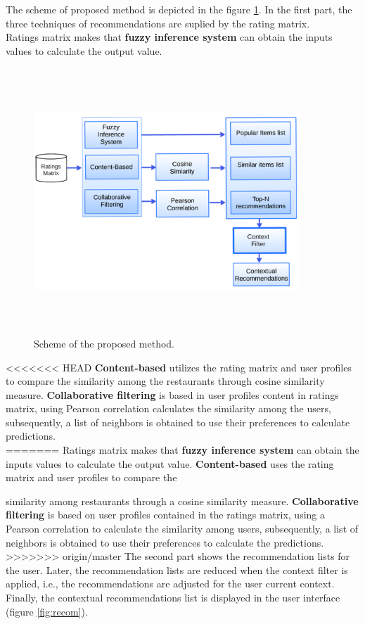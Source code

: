 The scheme of proposed method is depicted in the figure
\ref{fig:archit}. In the first part, the three techniques of
recommendations are suplied by the rating matrix. \\
Ratings matrix makes that \textbf{fuzzy inference system} can obtain
the inputs values to calculate the output value. 
\begin{figure}
\captionsetup{font=footnotesize}
\centering 
\includegraphics[width=10cm,height=10cm,keepaspectratio]{img/archit.png}
\caption{Scheme of the proposed method.}
\label{fig:archit}  
\end{figure}
<<<<<<< HEAD
\textbf{Content-based} 
utilizes the rating matrix and user profiles to compare the
similarity among the restaurants through cosine similarity measure.
\textbf{Collaborative filtering} is based in user profiles content in
ratings matrix, using Pearson correlation calculates the similarity
among the users, subsequently, a list of neighbors is obtained to use
their preferences to calculate predictions.\\
=======
Ratings matrix makes that \textbf{fuzzy inference system} can obtain
the inputs values to calculate the output value. \textbf{Content-based} 
uses the rating matrix and user profiles to compare the

similarity among restaurants through a cosine similarity measure.
\textbf{Collaborative filtering} is based on user profiles contained in
the ratings matrix, using a Pearson correlation to calculate the similarity
among users, subsequently, a list of neighbors is obtained to use
their preferences to calculate the predictions.\\
>>>>>>> origin/master
The second part shows the recommendation lists for the user. Later,
the recommendation lists are reduced when the context filter is applied,
i.e., the recommendations are adjusted for the user current context.
Finally, the contextual recommendations list is displayed in the user
interface (figure \ref{fig:recom}).






